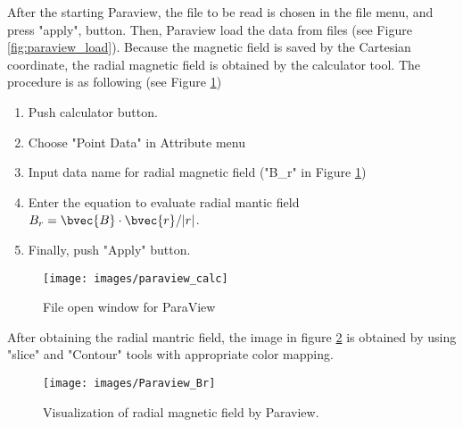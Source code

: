 After the starting Paraview, the file to be read is chosen in the file menu, and press "apply", button. Then, Paraview load the data from files (see Figure \ref{fig:paraview_load}). 
Because the magnetic field is saved by the Cartesian coordinate, the radial magnetic field is obtained by the calculator tool. The procedure is as following (see Figure \ref{fig:paraview_gen_Br})
%
\begin{enumerate}
\item Push calculator button.
\item Choose "Point Data" in Attribute menu
\item Input data name for radial magnetic field ("B\_r" in  Figure \ref{fig:paraview_gen_Br})
\item Enter the equation to evaluate radial mantic field $B_{r} = \bvec{B} \cdot \bvec{r} / |r|$.
\item Finally, push "Apply" button.
\end{enumerate}
%
%
\begin{figure}[htbp]
\begin{center}
\texttt{[image: images/paraview\_calc]}
\caption{File open window for ParaView}
\label{fig:paraview_gen_Br}
\end{center}
\end{figure}
%
After obtaining the radial mantric field, the image in figure \ref{fig:paraview_br} is obtained by using "slice" and  "Contour" tools with appropriate color mapping.
%
\begin{figure}[htbp]
\begin{center}
\texttt{[image: images/Paraview\_Br]}
\end{center}
\caption{Visualization of radial magnetic field by Paraview.}
\label{fig:paraview_br}
\end{figure}
%


